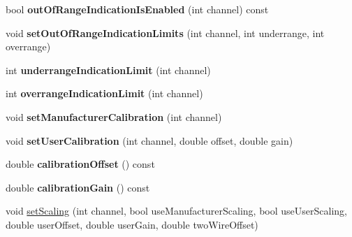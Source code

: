 \begin{DoxyCompactItemize}
\item 
\hypertarget{classmdt_device_modbus_wago_module_rtd_aaf6560fbb5cd285c072cf5df1dfad803}{
bool {\bfseries outOfRangeIndicationIsEnabled} (int channel) const }
\label{classmdt_device_modbus_wago_module_rtd_aaf6560fbb5cd285c072cf5df1dfad803}

\item 
\hypertarget{classmdt_device_modbus_wago_module_rtd_ab99db407dd15a4250e41168e5c592a3e}{
void {\bfseries setOutOfRangeIndicationLimits} (int channel, int underrange, int overrange)}
\label{classmdt_device_modbus_wago_module_rtd_ab99db407dd15a4250e41168e5c592a3e}

\item 
\hypertarget{classmdt_device_modbus_wago_module_rtd_ac3ebf8a90c7f87e1de7b45ea99ca3eac}{
int {\bfseries underrangeIndicationLimit} (int channel)}
\label{classmdt_device_modbus_wago_module_rtd_ac3ebf8a90c7f87e1de7b45ea99ca3eac}

\item 
\hypertarget{classmdt_device_modbus_wago_module_rtd_ad213401994beb43511ef70ca14098b9d}{
int {\bfseries overrangeIndicationLimit} (int channel)}
\label{classmdt_device_modbus_wago_module_rtd_ad213401994beb43511ef70ca14098b9d}

\item 
\hypertarget{classmdt_device_modbus_wago_module_rtd_add51b8d17f05661fa4e439f024094738}{
void {\bfseries setManufacturerCalibration} (int channel)}
\label{classmdt_device_modbus_wago_module_rtd_add51b8d17f05661fa4e439f024094738}

\item 
\hypertarget{classmdt_device_modbus_wago_module_rtd_a74188cf0391b3875adc599055bc8d459}{
void {\bfseries setUserCalibration} (int channel, double offset, double gain)}
\label{classmdt_device_modbus_wago_module_rtd_a74188cf0391b3875adc599055bc8d459}

\item 
\hypertarget{classmdt_device_modbus_wago_module_rtd_a675d78379e2a0727f8d250499d7d82ca}{
double {\bfseries calibrationOffset} () const }
\label{classmdt_device_modbus_wago_module_rtd_a675d78379e2a0727f8d250499d7d82ca}

\item 
\hypertarget{classmdt_device_modbus_wago_module_rtd_a22e025ae3b60ae3dce4632ca2ea86b6c}{
double {\bfseries calibrationGain} () const }
\label{classmdt_device_modbus_wago_module_rtd_a22e025ae3b60ae3dce4632ca2ea86b6c}

\item 
\hypertarget{classmdt_device_modbus_wago_module_rtd_a67ab613e399574816cc9df0b7eca0496}{
void \hyperlink{classmdt_device_modbus_wago_module_rtd_a67ab613e399574816cc9df0b7eca0496}{setScaling} (int channel, bool useManufacturerScaling, bool useUserScaling, double userOffset, double userGain, double twoWireOffset)}
\label{classmdt_device_modbus_wago_module_rtd_a67ab613e399574816cc9df0b7eca0496}


\end{DoxyCompactItemize}
